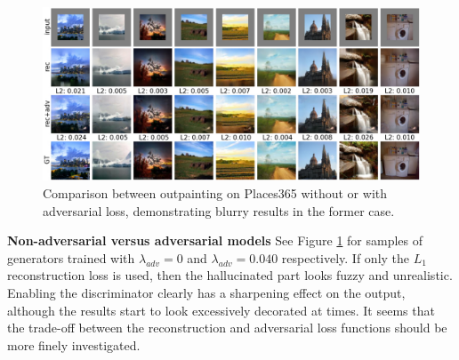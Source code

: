 \documentclass[twocolumn,showpacs,%
  nofootinbib,aps,superscriptaddress,%
  eqsecnum,prd,notitlepage,showkeys,10pt]{revtex4-1}
\begin{document}
\begin{figure}[tp]
\centering
  \begin{adjustbox}{center}
  \includegraphics[width=\textwidth]{B2_B3_cmp3}
  \end{adjustbox}
  \caption{Comparison between outpainting on Places365 without or with adversarial loss, demonstrating blurry results in the former case.}
  \label{fig:B2_B3_cmp}
\end{figure}

\textbf{Non-adversarial versus adversarial models} \hspace{0.3cm}
See Figure \ref{fig:B2_B3_cmp} for samples of generators trained with $\lambda_{adv}=0$ and $\lambda_{adv}=0.040$ respectively. If only the $L_1$ reconstruction loss is used, then the hallucinated part looks fuzzy and unrealistic. Enabling the discriminator clearly has a sharpening effect on the output, although the results start to look excessively decorated at times. It seems that the trade-off between the reconstruction and adversarial loss functions should be more finely investigated.
\end{document}
